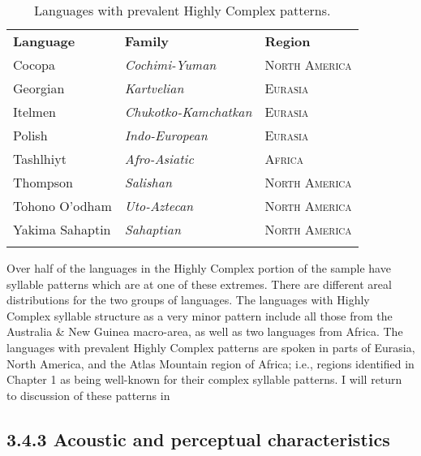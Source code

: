 \begin{table}
\begin{tabularx}{\textwidth}{XXX}
\lsptoprule

\textbf{Language} & \textbf{Family} & \textbf{Region}\\
Cocopa & \textit{Cochimi-Yuman} & \textsc{North} \textsc{America}\\
Georgian & \textit{Kartvelian} & \textsc{Eurasia}\\
Itelmen & \textit{Chukotko-Kamchatkan} & \textsc{Eurasia}\\
Polish & \textit{Indo-European} & \textsc{Eurasia}\\
Tashlhiyt & \textit{Afro-Asiatic} & \textsc{Africa}\\
Thompson & \textit{Salishan} & \textsc{North} \textsc{America}\\
Tohono O’odham & \textit{Uto-Aztecan} & \textsc{North} \textsc{America}\\
Yakima Sahaptin & \textit{Sahaptian} & \textsc{North} \textsc{America}\\
\lspbottomrule
\end{tabularx}
\caption{\label{3.16}Languages with prevalent Highly Complex patterns.}
\end{table}

  Over half of the languages in the Highly Complex portion of the sample have syllable patterns which are at one of these extremes. There are different areal distributions for the two groups of languages. The languages with Highly Complex syllable structure as a very minor pattern include all those from the Australia \& New Guinea macro-area, as well as two languages from Africa. The languages with prevalent Highly Complex patterns are spoken in parts of Eurasia, North America, and the Atlas Mountain region of Africa; i.e., regions identified in Chapter 1 as being well-known for their complex syllable patterns. I will return to discussion of these patterns in 

\subsection{3.4.3 Acoustic and perceptual characteristics}

